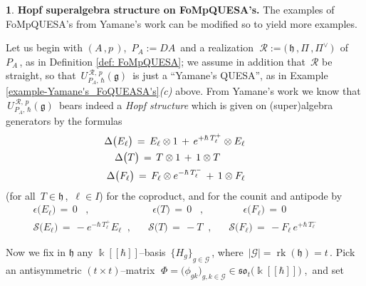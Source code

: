 \documentclass[12pt,reqno,twoside,a4paper]{amsart}
\numberwithin{equation}{section}
\theoremstyle{definition}
\newtheorem{free text}[lema]{}
\theoremstyle{remark}
\newcommand \rk{\operatorname{rk}}
\newcommand{\R}{{\mathcal R}}
\newcommand{\G}{{\mathcal G}}
\def \kh{{\Bbbk[[\hbar]]}}
\def \G {\mathcal{G}}
\def \SS {\mathcal{S}}
\def \lieg{\mathfrak{g}}
\def \lieh{\mathfrak{h}}
\def \lieso{\mathfrak{so}}
\theoremstyle{plain}
\begin{document}
\vskip9pt

\begin{free text}  \label{FoMpQUESA from Yamane's QUESA}
%
 \textbf{Hopf superalgebra structure on FoMpQUESA's.}
%
 The examples of FoMpQUESA's from Yamane's work can be modified so to yield more examples.

   Let us begin with  $ (A\,,p\,) $,  $ \, P_A := DA \, $  and a realization
   $ \; \R := \big(\, \lieh \, , \Pi \, , \Pi^\vee \,\big) \; $  of  $ P_A \, $,  as in  Definition \ref{def: FoMpQUESA};
   we assume in addition that  $ \, \R $  be straight, so that  $ \, U_{P_A,\,\hbar}^{\,\R,\,p}(\lieg) \, $
   is just a ``Yamane's QUESA'', as in  Example \ref{example-Yamane's_FoQUEASA's}\textit{(c)\/}  above.
   From Yamane's work  \cite{Ya1}  we know that  $ \, U_{P_A,\,\hbar}^{\,\R,\,p}(\lieg) \, $
   bears indeed a  \textsl{Hopf structure\/}  which is given on (super)algebra generators by the formulas
%
\begin{equation}  \label{eq: coprod_x_uRpPhg}
%
 \begin{aligned}
   \Delta \big(E_\ell\big)  \, = \,  E_\ell \otimes 1 \, + \, e^{+\hbar \, T_\ell^+} \otimes E_\ell  \\
   \Delta\big(T\big)  \, = \,  T \otimes 1 \, + \, 1 \otimes T   \hskip25pt  \\
   \Delta\big(F_\ell\big)  \, = \, F_\ell \otimes e^{-\hbar \, T_\ell^-} \, + \, 1 \otimes F_\ell
%
 \end{aligned}   \qquad
%
\end{equation}
%
 (for all  $ \, T \in \lieh \, $,  $ \, \ell \in I $)  for the coproduct,
 and for the counit and antipode by
%
 \vskip-9pt
%
\begin{eqnarray}
%
   \epsilon\big(E_\ell\big) \, = \, 0  \;\;\; ,  \qquad  &   \;\quad
   \epsilon\big(T\big) \, = \, 0  \;\;\; ,  &
   \;\qquad  \epsilon\big(F_\ell\big) \, = \, 0  \;\;\;\;  \label{eq: counit_x_uPhg}  \\
%
   \SS\big(E_\ell\big)  \, = \,  - e^{-\hbar \, T_\ell^+} E_\ell  \;\; ,  &   \;\;\;
   \SS\big(T\big)  \, = \,  - T   \;\; ,  &
   \;\;\;  \SS\big(F_\ell\big)  \, = \,  - F_\ell \, e^{+\hbar \, T_\ell^-}   \qquad
  \label{eq: antipode_x_uPhg}
%
\end{eqnarray}
%
\par
   Now we fix in  $ \lieh $  any  $ \kh $--basis  $ \, {\big\{ H_g \big\}}_{g \in \G} \, $,
   where  $ \, |\G| = \rk(\lieh) = t \, $.  Pick an antisymmetric  $ (t \times t) $--matrix
   $ \; \Phi = \big( \phi_{gk} \big)_{g, k \in \G} \in \lieso_t\big(\kh\big)  \; $,  \,and set

\end{free text}
\end{document}
